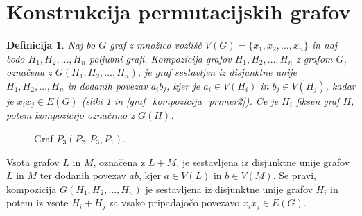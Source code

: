 \documentclass[a4paper, 12pt]{book}
\newtheorem{definicija}{Definicija}[chapter]
\begin{document}
\section{ Konstrukcija permutacijskih grafov}

\begin{definicija}
    Naj bo $G$ graf z množico vozlišč $V(G) = \{x_1, x_2, \dots, x_n\}$ in naj bodo $H_1, H_2, \dots, H_n$ poljubni grafi. Kompozicija grafov $H_1, H_2, \dots, H_n$ z grafom $G$, označena z $G(H_1, H_2, \dots, H_n)$, je graf sestavljen iz disjunktne unije $H_1, H_2, \dots, H_n$ in dodanih povezav $a_ib_j$, kjer je $a_i \in V(H_i)$ in $b_j \in V(H_j)$, kadar je $x_ix_j \in E(G)$ (sliki \ref{graf_kompozicija_primer1} in \ref{graf_kompozicija_primer2}). Če je $H_i$ fiksen graf $H$, potem kompozicijo označimo z $G(H)$. 
\end{definicija}

\begin{figure}[h]
    \begin{center}        
    \end{center}
    \caption{Graf $P_3(P_2, P_3, P_1)$.}
    \label{graf_kompozicija_primer1}
\end{figure}

Vsota grafov $L$ in $M$, označena z $L + M$, je sestavljena iz disjunktne unije grafov $L$ in $M$ ter dodanih povezav $ab$, kjer $a \in V(L)$ in $b \in V(M)$. Se pravi, kompozicija $G(H_1, H_2, \dots, H_n)$ je sestavljena iz disjunktne unije grafov $H_i$ in potem iz vsote $H_i + H_j$ za vsako pripadajočo povezavo $x_ix_j \in E(G)$.
\end{document}
